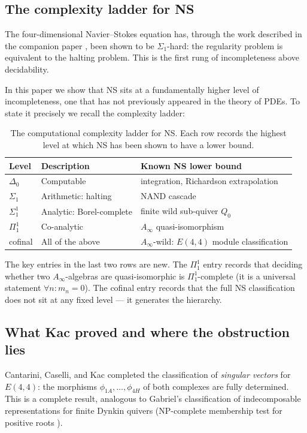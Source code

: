 \documentclass[reqno,10pt]{amsart}
\theoremstyle{plain}
\theoremstyle{definition}
\def\gE{E(4,4)}
\begin{document}
\subsection{The complexity ladder for NS}

The four-dimensional Navier--Stokes equation has, through the work described
in the companion paper \cite{Paper1}, been shown to be $\Sigma_1$-hard:
the regularity problem is equivalent to the halting problem.  This is the
first rung of incompleteness above decidability.

In this paper we show that NS sits at a fundamentally higher level of
incompleteness, one that has not previously appeared in the theory of PDEs.
To state it precisely we recall the complexity ladder:

\begin{table}[h]
\centering
\begin{tabular}{lll}
\toprule
Level & Description & Known NS lower bound \\
\midrule
$\Delta_0$ & Computable & integration, Richardson extrapolation \\
$\Sigma_1$ & Arithmetic: halting & NAND cascade \cite{Paper1} \\
$\Sigma_1^1$ & Analytic: Borel-complete & finite wild sub-quiver $Q_0$ \\
$\Pi_1^1$ & Co-analytic & $A_\infty$ quasi-isomorphism \\
cofinal & All of the above & $A_\infty$-wild: $E(4,4)$ module classification \\
\bottomrule
\end{tabular}
\caption{The computational complexity ladder for NS.  Each row records the
highest level at which NS has been shown to have a lower bound.}
\label{tab:ladder}
\end{table}

The key entries in the last two rows are new.  The $\Pi_1^1$ entry records
that deciding whether two $A_\infty$-algebras are quasi-isomorphic is
$\Pi_1^1$-complete (it is a universal statement $\forall n: m_n = 0$).
The cofinal entry records that the full NS classification does not sit at
any fixed level — it generates the hierarchy.

\subsection{What Kac proved and where the obstruction lies}

Cantarini, Caselli, and Kac \cite{CCK2026} completed the classification of
\emph{singular vectors} for $\gE$: the morphisms $\phi_{1A}, \ldots, \phi_{4H}$
of both complexes are fully determined.  This is a complete result, analogous
to Gabriel's classification of indecomposable representations for finite Dynkin
quivers (NP-complete membership test for positive roots \cite{Kac1982}).
\end{document}
